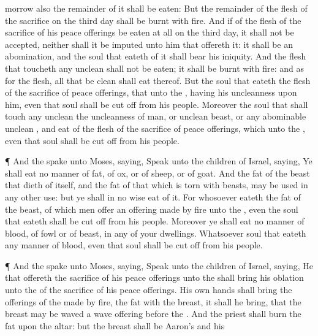 {morrow also the
remainder of it shall be
eaten:
But the
remainder of the
flesh of the
sacrifice on the
third
day shall be
burnt with
fire.
And if
{} of the
flesh of the
sacrifice of his peace
offerings be
eaten at
all on the
third
day, it shall not be
accepted, neither shall it be
imputed unto him that
offereth it: it shall be an
abomination, and the
soul that
eateth of it shall
bear his
iniquity.
And the
flesh that
toucheth any
unclean
{} shall not be
eaten; it shall be
burnt with
fire: and as for the
flesh, all that be
clean shall
eat thereof.
But the
soul that
eateth
{} the
flesh of the
sacrifice of peace
offerings, that
{} unto the
{}, having his
uncleanness upon him, even that
soul shall be cut
off from his
people.
Moreover the
soul that shall
touch any
unclean
{} the
uncleanness of
man, or
{}
unclean
beast, or any
abominable
unclean
{}, and
eat of the
flesh of the
sacrifice of peace
offerings, which
{} unto the
{}, even that
soul shall be cut
off from his
people.
\par }{\PP {}¶ And the
{}
spake unto
Moses,
saying,
Speak unto the
children of
Israel,
saying, Ye shall
eat no manner of
fat, of
ox, or of
sheep, or of
goat.
And the
fat of the beast that dieth of
itself, and the
fat of that which is torn with
beasts, may be
used in any other
use: but ye shall in no
wise
eat of it.
For whosoever
eateth the
fat of the
beast, of which men
offer an offering made by
fire unto the
{}, even the
soul that
eateth
{} shall be cut
off from his
people.
Moreover ye shall
eat no manner of
blood,
{} of
fowl or of
beast, in any of your
dwellings.
Whatsoever
soul
{} that
eateth any
manner of
blood, even that
soul shall be cut
off from his
people.
\par }{\PP {}¶ And the
{}
spake unto
Moses,
saying,
Speak unto the
children of
Israel,
saying, He that
offereth the
sacrifice of his peace
offerings unto the
{} shall
bring his
oblation unto the
{} of the
sacrifice of his peace
offerings.
His own
hands shall
bring the
offerings of the
{} made by
fire, the
fat with the
breast, it shall he
bring, that the
breast may be
waved
{} a wave
offering
before the
{}.
And the
priest shall
burn the
fat upon the
altar: but the
breast shall be
Aaron’s and his
}

